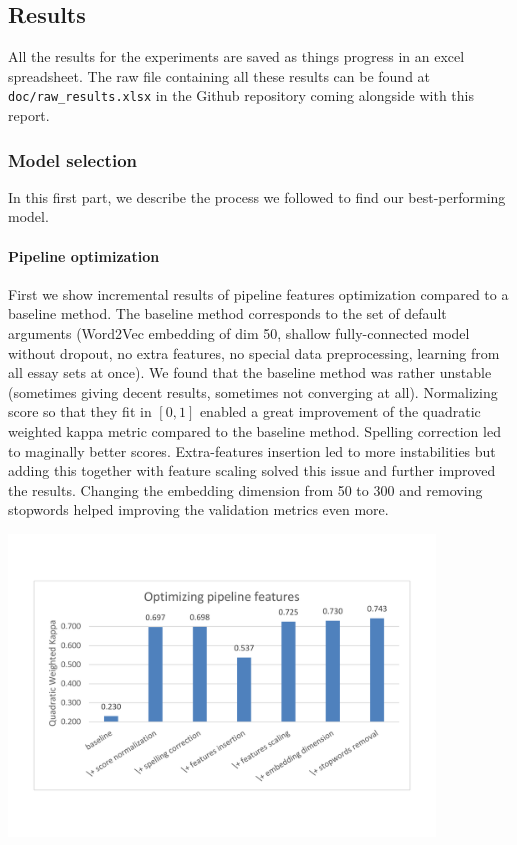 \documentclass[a4paper,12pt,english]{article}
\begin{document}
\subsection{Results}
All the results for the experiments are saved as things progress in an excel spreadsheet. The raw file containing all these results can be found at \verb+doc/raw_results.xlsx+ in the Github repository coming alongside with this report.

\subsubsection{Model selection}
In this first part, we describe the process we followed to find our best-performing model.

\paragraph{Pipeline optimization} First we show incremental results of pipeline features optimization compared to a baseline method. The baseline method corresponds to the set of default arguments (Word2Vec embedding of dim 50, shallow fully-connected model without dropout, no extra features, no special data preprocessing, learning from all essay sets at once). We found that the baseline method was rather unstable (sometimes giving decent results, sometimes not converging at all). Normalizing score so that they fit in $[0, 1]$ enabled a great improvement of the quadratic weighted kappa metric compared to the baseline method. Spelling correction led to maginally better scores. Extra-features insertion led to more instabilities but adding this together with feature scaling solved this issue and further improved the results. Changing the embedding dimension from 50 to 300 and removing stopwords helped improving the validation metrics even more.

\begin{center}
\vspace*{-1.5cm}
\includegraphics[width=0.85\textwidth]{fig/opt_pip_feat.pdf}
\vspace*{-1.5cm}
\end{center}
\end{document}

